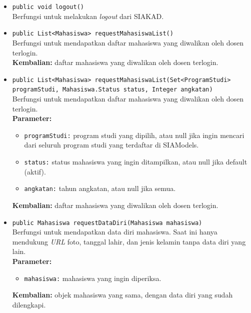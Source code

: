 \begin{enumerate}
\begin{itemize}
        \item \texttt{public void logout()}\\
	    Berfungsi untuk melakukan \textit{logout} dari SIAKAD.
	    
	    \item \texttt{public List<Mahasiswa> requestMahasiswaList()}\\
	    Berfungsi untuk mendapatkan daftar mahasiswa yang diwalikan oleh dosen terlogin.\\
        \textbf{Kembalian:} daftar mahasiswa yang diwalikan oleh dosen terlogin.
        
        \item \texttt{public List<Mahasiswa> requestMahasiswaList(Set<ProgramStudi>\\ programStudi, Mahasiswa.Status status, Integer angkatan)}\\
         Berfungsi untuk mendapatkan daftar mahasiswa yang diwalikan oleh dosen terlogin.\\
        \textbf{Parameter:}
		\begin{itemize}
			\item \texttt{programStudi:} program studi yang dipilih, atau null jika ingin mencari dari seluruh program studi yang terdaftar di SIAModels.
			\item \texttt{status:} status mahasiswa yang ingin ditampilkan, atau null jika default (aktif).
			\item \texttt{angkatan:} tahun angkatan, atau null jika semua.
		\end{itemize}
        \textbf{Kembalian:} daftar mahasiswa yang diwalikan oleh dosen terlogin.

	    \item \texttt{public Mahasiswa requestDataDiri(Mahasiswa mahasiswa)}\\
	    Berfungsi untuk mendapatkan data diri mahasiswa. Saat ini hanya mendukung \textit{URL} foto, tanggal lahir, dan jenis kelamin tanpa data diri yang lain.\\
	    \textbf{Parameter:}
		\begin{itemize}
			\item \texttt{mahasiswa:} mahasiswa yang ingin diperiksa.
		\end{itemize}
        \textbf{Kembalian:} objek mahasiswa yang sama, dengan data diri yang sudah dilengkapi.
        

\end{itemize}
\end{enumerate}
